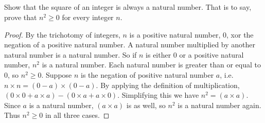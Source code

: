 \documentclass[../../main.tex]{subfiles}
\begin{document}
\subsection{}

\begin{q}
    Show that the square of an integer is always a natural number. That is to say, prove that $n^2 \geq 0$ for every integer $n$.
\end{q}

\begin{proof}
    By the trichotomy of integers, $n$ is a positive natural number, $0$, xor the negation of a positive natural number.
    A natural number multiplied by another natural number is a natural number.
    So if $n$ is either $0$ or a positive natural number, $n^2$ is a natural number.
    Each natural number is greater than or equal to $0$, so $n^2 \geq 0$.
    Suppose $n$ is the negation of positive natural number $a$, i.e. $n \times n = (0-a) \times (0-a)$. 
    By applying the definition of multiplication, $(0 \times 0 + a \times a)-(0 \times a + a \times 0)$. 
    Simplifying this we have $n^2 = (a \times a)$. 
    Since $a$ is a natural number, $(a \times a )$ is as well, so $n^2$ is a natural number again.
    Thus $n^2 \geq 0$ in all three cases.
\end{proof}
\end{document}
